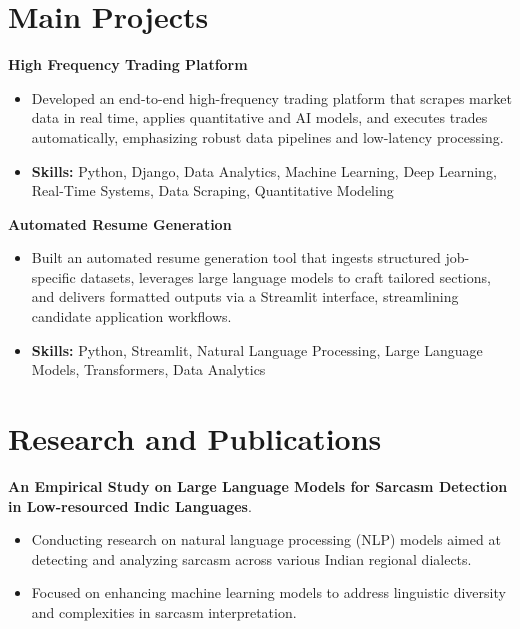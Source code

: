 \documentclass[a4paper,11pt]{article}
\begin{document}
\section{\textbf{Main Projects}}

\vspace{1mm}
  \textbf{High Frequency Trading Platform  }
\vspace{-1.5mm} %
\begin{itemize}
  \item Developed an end-to-end high-frequency trading platform that scrapes market data in real time, applies quantitative and AI models, and executes trades automatically, emphasizing robust data pipelines and low-latency processing.
\vspace{-3mm}
  \item \textbf{Skills:} Python, Django, Data Analytics, Machine Learning, Deep Learning, Real-Time Systems, Data Scraping, Quantitative Modeling
\end{itemize}


\vspace{1mm}
   \textbf{Automated Resume Generation }
\vspace{-1.5mm} %
\begin{itemize}
  \item Built an automated resume generation tool that ingests structured job-specific datasets, leverages large language models to craft tailored sections, and delivers formatted outputs via a Streamlit interface, streamlining candidate application workflows.
\vspace{-3mm}
  \item \textbf{Skills:} Python, Streamlit, Natural Language Processing, Large Language Models, Transformers, Data Analytics
\end{itemize}



\section{\textbf{Research and Publications} \hfill }
\vspace{1mm}
  \textbf{An Empirical Study on Large Language Models for Sarcasm Detection in Low-resourced Indic Languages}.
\vspace{-1mm} %
\begin{itemize}
  \item Conducting research on natural language processing (NLP) models aimed at detecting and analyzing sarcasm across various Indian regional dialects.
\vspace{-3mm}
  \item Focused on enhancing machine learning models to address linguistic diversity and complexities in sarcasm interpretation.
\end{itemize}
\end{document}
